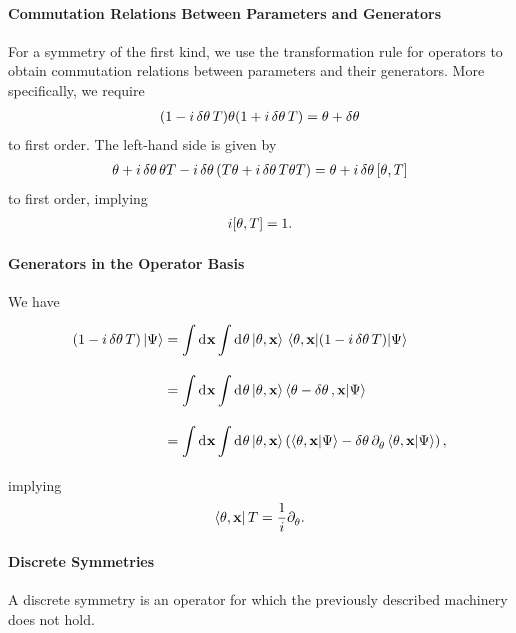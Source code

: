 \paragraph{Commutation Relations Between Parameters and Generators}
For a symmetry of the first kind, we use the transformation rule for operators to obtain commutation relations between parameters and their generators. More specifically, we require
\begin{align*}
	(1 - i\var{\theta}T)\theta(1 + i\var{\theta}T) = \theta + \var{\theta}
\end{align*}
to first order. The left-hand side is given by
\begin{align*}
	\theta + i\var{\theta}\theta T - i\var{\theta}(T\theta + i\var{\theta}T\theta T) = \theta + i\var{\theta}\comm{\theta}{T}
\end{align*}
to first order, implying
\begin{align*}
	i\comm{\theta}{T} = 1.
\end{align*}

\paragraph{Generators in the Operator Basis}
We have
\begin{align*}
	\left(1 - i\var{\theta}T\right)\ket{\Psi} &= \int\limits_{}^{}\dd[]{\vb{x}}\int\limits_{}^{}\dd[]{\theta}\ket{\theta, \vb{x}}\mel{\theta, \vb{x}}{\left(1 - i\var{\theta}T\right)}{\Psi} \\
	                                          &= \int\limits_{}^{}\dd[]{\vb{x}}\int\limits_{}^{}\dd[]{\theta}\ket{\theta, \vb{x}}\braket{\theta - \var{\theta}, \vb{x}}{\Psi} \\
	                                          &= \int\limits_{}^{}\dd[]{\vb{x}}\int\limits_{}^{}\dd[]{\theta}\ket{\theta, \vb{x}}\left(\braket{\theta, \vb{x}}{\Psi} - \var{\theta}\partial_{\theta}^{}\braket{\theta, \vb{x}}{\Psi}\right),
\end{align*}
implying
\begin{align*}
	\bra{\theta, \vb{x}}T = \frac{1}{i}\partial_{\theta}^{}.
\end{align*}

\paragraph{Discrete Symmetries}
A discrete symmetry is an operator for which the previously described machinery does not hold.

